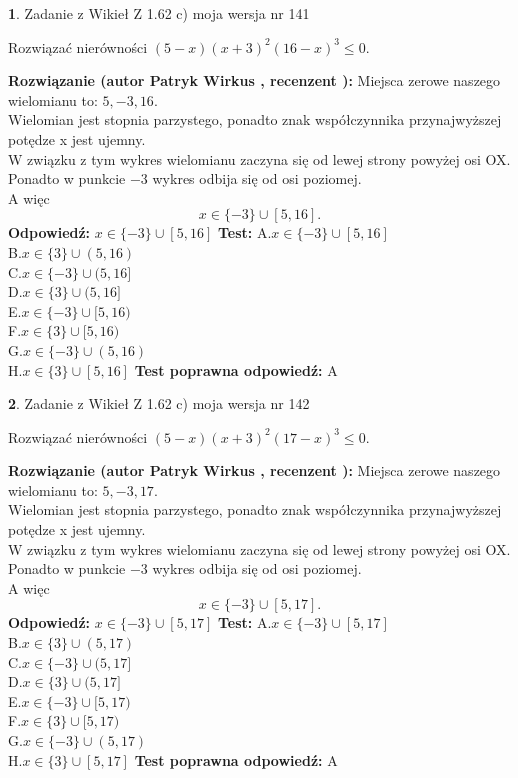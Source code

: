 \documentclass[12pt, a4paper]{article}
\theoremstyle{definition} %
\newtheorem{zad}{}
\newcommand{\zadStart}[1]{\begin{zad}#1\newline}
\newcommand{\zadStop}{\end{zad}}
\newcommand{\rozwStart}[2]{\noindent \textbf{Rozwiązanie (autor #1 , recenzent #2): }\newline}
\newcommand{\rozwStop}{\newline}
\newcommand{\odpStart}{\noindent \textbf{Odpowiedź:}\newline}
\newcommand{\odpStop}{\newline}
\newcommand{\testStart}{\noindent \textbf{Test:}\newline}
\newcommand{\testStop}{\newline}
\newcommand{\kluczStart}{\noindent \textbf{Test poprawna odpowiedź:}\newline}
\newcommand{\kluczStop}{\newline}
\begin{document}
\zadStart{Zadanie z Wikieł Z 1.62 c) moja wersja nr 141}

Rozwiązać nierówności $(5-x)(x+3)^{2}(16-x)^{3}\le0$.
\zadStop
\rozwStart{Patryk Wirkus}{}
Miejsca zerowe naszego wielomianu to: $5, -3, 16$.\\
Wielomian jest stopnia parzystego, ponadto znak współczynnika przy\linebreak najwyższej potędze x jest ujemny.\\ W związku z tym wykres wielomianu zaczyna się od lewej strony powyżej osi OX.\\
Ponadto w punkcie $-3$ wykres odbija się od osi poziomej.\\
A więc $$x \in \{-3\} \cup [5,16].$$
\rozwStop
\odpStart
$x \in \{-3\} \cup [5,16]$
\odpStop
\testStart
A.$x \in \{-3\} \cup [5,16]$\\
B.$x \in \{3\} \cup (5,16)$\\
C.$x \in \{-3\} \cup (5,16]$\\
D.$x \in \{3\} \cup (5,16]$\\
E.$x \in \{-3\} \cup [5,16)$\\
F.$x \in \{3\} \cup [5,16)$\\
G.$x \in \{-3\} \cup (5,16)$\\
H.$x \in \{3\} \cup [5,16]$
\testStop
\kluczStart
A
\kluczStop



\zadStart{Zadanie z Wikieł Z 1.62 c) moja wersja nr 142}

Rozwiązać nierówności $(5-x)(x+3)^{2}(17-x)^{3}\le0$.
\zadStop
\rozwStart{Patryk Wirkus}{}
Miejsca zerowe naszego wielomianu to: $5, -3, 17$.\\
Wielomian jest stopnia parzystego, ponadto znak współczynnika przy\linebreak najwyższej potędze x jest ujemny.\\ W związku z tym wykres wielomianu zaczyna się od lewej strony powyżej osi OX.\\
Ponadto w punkcie $-3$ wykres odbija się od osi poziomej.\\
A więc $$x \in \{-3\} \cup [5,17].$$
\rozwStop
\odpStart
$x \in \{-3\} \cup [5,17]$
\odpStop
\testStart
A.$x \in \{-3\} \cup [5,17]$\\
B.$x \in \{3\} \cup (5,17)$\\
C.$x \in \{-3\} \cup (5,17]$\\
D.$x \in \{3\} \cup (5,17]$\\
E.$x \in \{-3\} \cup [5,17)$\\
F.$x \in \{3\} \cup [5,17)$\\
G.$x \in \{-3\} \cup (5,17)$\\
H.$x \in \{3\} \cup [5,17]$
\testStop
\kluczStart
A
\kluczStop
\end{document}
